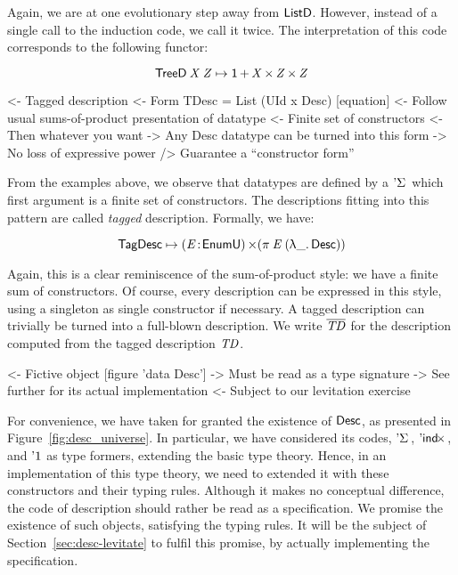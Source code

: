 Again, we are at one evolutionary step away from $\ListD$. However,
instead of a single call to the induction code, we call it twice. The
interpretation of this code corresponds to the following functor:

\[    \TreeD\: \V{X}\: \V{Z} \mapsto \Unit \mathop{\D{+}} \V{X} \Prod \V{Z} \Prod \V{Z}     \]


\begin{wstructure}
<- Tagged description
    <- Form TDesc = List (UId x Desc) [equation]
    <- Follow usual sums-of-product presentation of datatype
        <- Finite set of constructors
        <- Then whatever you want
    -> Any Desc datatype can be turned into this form
        -> No loss of expressive power
        /> Guarantee a ``constructor form''
\end{wstructure}

From the examples above, we observe that datatypes are defined by a
$\DSigma{\!}{\!}$ which first argument is a finite set of
constructors. The descriptions fitting into this pattern are called
\emph{tagged} description. Formally, we have:

\[
 \TagDesc \mapsto \SIGMA{\V{E}}{\EnumU} (\spi{\V{E}}{(\LAM{\_} \Desc)})
\]

Again, this is a clear reminiscence of the sum-of-product style:
we have a finite sum of constructors. Of course, every description can
be expressed in this style, using a singleton as single constructor if
necessary. A tagged description can trivially be turned into a
full-blown description. We write $\toDesc{\V{TD}}$ for the description computed
from the tagged description $\V{TD}$.

\begin{wstructure}
<- Fictive object [figure 'data Desc']
    -> Must be read as a type signature
    -> See further for its actual implementation
        <- Subject to our levitation exercise
\end{wstructure}

For convenience, we have taken for granted the existence of $\Desc$,
as presented in Figure~\ref{fig:desc_universe}. In particular, we have
considered its codes, $\DSigma{\!}{\!}$, $\DIndx{\!}$, and $\DUnit$ as
type formers, extending the basic type theory. Hence, in an
implementation of this type theory, we need to extended it with these
constructors and their typing rules. Although it makes no conceptual
difference, the code of description should rather be read as a
specification. We promise the existence of such objects, satisfying
the typing rules. It will be the subject of
Section~\ref{sec:desc-levitate} to fulfil this promise, by actually
implementing the specification.

